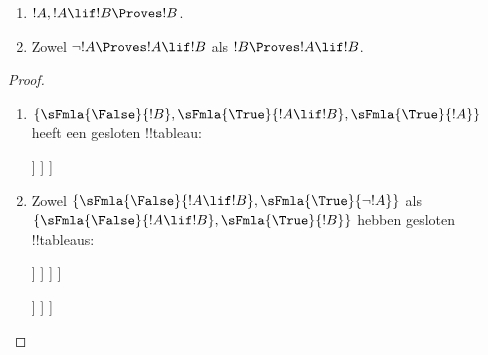 \documentclass[../../../include/open-logic-section]{subfiles}
\begin{document}
\begin{prop}
  \begin{enumerate}
  \item {}  $!A, !A \lif !B \Proves !B$.
  \item {}
    Zowel $\lnot !A \Proves !A \lif !B$ als $!B \Proves !A \lif !B$.
  \end{enumerate}
\end{prop}

\begin{proof}
  \begin{enumerate}
    \item $\{\sFmla{\False}{!B}, \sFmla{\True}{!A \lif !B},
      \sFmla{\True}{!A}\}$ heeft een gesloten !!{tableau}:
      \begin{oltableau}
        [\sFmla{\False}{\formula{B}}, just=\TAss
          [\sFmla{\True}{\formula{A} \lif \formula{B}}, just=\TAss
            [\sFmla{\True}{\formula{A}}, just=\TAss
              [\sFmla{\False}{\formula{A}}, just = {\TRule{\True}{\lif}[2]}, close]
              [\sFmla{\True}{\formula{B}}, just = {\TRule{\True}{\lif}[2]}, close]
            ]
          ]
        ]
      \end{oltableau}
    \item Zowel $\{\sFmla{\False}{!A \lif !B},
      \sFmla{\True}{\lnot !A}\}$ als $\{\sFmla{\False}{!A \lif !B},
      \sFmla{\True}{!B}\}$ hebben gesloten !!{tableau}s:
      \begin{oltableau}
        [\sFmla{\False}{\formula{A} \lif \formula{B}}, just = \TAss
          [\sFmla{\True}{\lnot \formula{A}}, just = \TAss
            [\sFmla{\True}{\formula{A}}, just = {\TRule{\False}{\lif}[1]}
              [\sFmla{\False}{\formula{B}}, just = {\TRule{\False}{\lif}[1]}
                [\sFmla{\False}{\formula{A}}, just = {\TRule{\True}{\lnot}[2]}, close]
              ]
            ]
          ]
        ]
      \end{oltableau}
      \begin{oltableau}
        [\sFmla{\False}{\formula{A} \lif \formula{B}}, just = \TAss
          [\sFmla{\True}{\formula{B}}, just = \TAss
            [\sFmla{\True}{\formula{A}}, just = {\TRule{\False}{\lif}[1]}
              [\sFmla{\False}{\formula{B}}, just = {\TRule{\False}{\lif}[1]},close
              ]
            ]
          ]
        ]
      \end{oltableau}
  \end{enumerate}
\end{proof}
\end{document}
